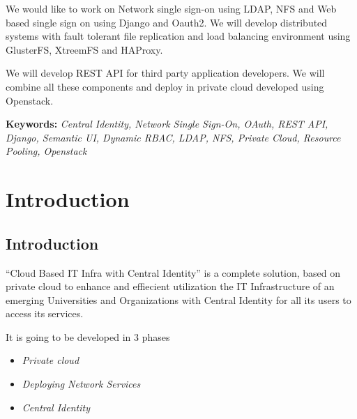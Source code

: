 \documentclass[12pt]{report}
\begin{document}
We would like to work on Network single sign-on using LDAP, NFS and Web based single sign on using Django and Oauth2. We will develop distributed systems with fault tolerant file replication and load balancing environment using GlusterFS, XtreemFS and HAProxy. \newline

We will develop REST API for third party application developers. We will combine all these components and deploy in private cloud developed using Openstack. \newline

\textbf{Keywords:} \textit{Central Identity, Network Single Sign-On, OAuth, REST API, Django, Semantic UI, Dynamic RBAC, LDAP, NFS, Private Cloud, Resource Pooling, Openstack}
%
%



\tableofcontents
\listoffigures
\listoftables
\pagebreak \thispagestyle{empty} \pagebreak

 
\setcounter{page}{1}


\chapter{Introduction}

\section{Introduction}
	``Cloud Based IT Infra with Central Identity'' is a complete solution, based on private cloud to enhance and effiecient utilization the IT Infrastructure of an emerging Universities and Organizations with Central Identity for all its users to access its services.\newline

	It is going to be developed in 3 phases 
	\begin{itemize}
		\item \textit{Private cloud} 
		\item \textit{Deploying Network Services} 
		\item \textit{Central Identity}
	\end{itemize}
	
\end{document}
